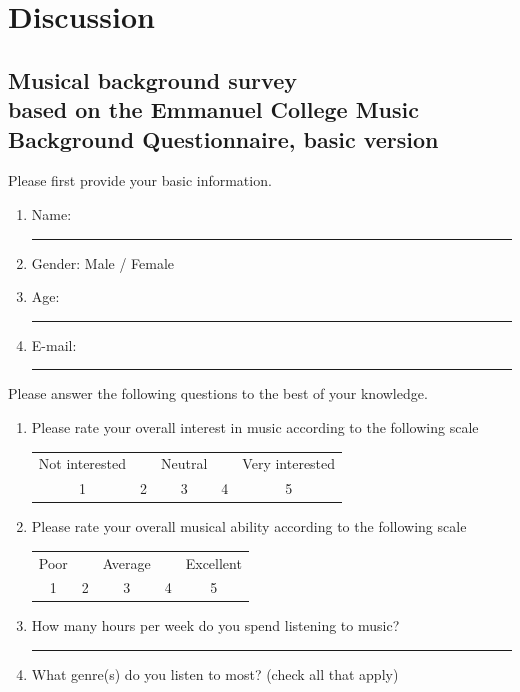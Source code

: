 \documentclass[a4paper,11pt]{article}
\newcommand{\myunderline}{\rule{2in}{.5pt}}
\begin{document}
\section{Discussion}


\begin{appendices}

\section[Musical background survey]{Musical background survey\\
	{\normalsize based on the Emmanuel College Music Background Questionnaire, basic version}}

Please first provide your basic information.

\begin{enumerate}
	\item Name: \myunderline
	\item Gender: Male / Female
	\item Age: \myunderline
	\item E-mail: \myunderline
\end{enumerate}
Please answer the following questions to the best of your knowledge.
\begin{enumerate}[resume]

	\item Please rate your overall interest in music according to the following scale

	\begin{tabular}{c c c c c}
		Not interested & & Neutral & & Very interested \\
		1 & 2 & 3 & 4 & 5 \\
	\end{tabular}

	\item Please rate your overall musical ability according to the following scale

	\begin{tabular}{c c c c c}
		Poor & & Average & & Excellent \\
		1 & 2 & 3 & 4 & 5 \\
	\end{tabular}

	\item How many hours per week do you spend listening to music?

	\myunderline

	\item What genre(s) do you listen to most? (check all that apply)


\end{enumerate}
\end{appendices}
\end{document}
